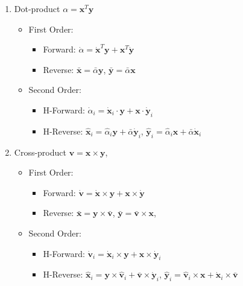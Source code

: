 \documentclass{article}
\newcommand{\vx}{\mathbf{x}}
\newcommand{\vxpi}{\dot{\mathbf{x}}_{i}}
\newcommand{\vxhi}{\hat{\mathbf{x}}_{i}}
\newcommand{\ab}{\bar{\alpha}}
\newcommand{\api}{\dot{\alpha}_{i}}
\newcommand{\ahi}{\hat{\alpha}_{i}}
\newcommand{\vy}{\mathbf{y}}
\newcommand{\vypi}{\dot{\mathbf{y}}_{i}}
\newcommand{\vyhi}{\hat{\mathbf{y}}_{i}}
\newcommand{\vvb}{\bar{\mathbf{v}}}
\newcommand{\vvpi}{\dot{\mathbf{v}}_{i}}
\newcommand{\vvhi}{\hat{\mathbf{v}}_{i}}
\begin{document}
\begin{enumerate}
        \item Dot-product $\alpha = \mathbf{x}^{T} \mathbf{y}$
        \begin{itemize}
            \item First Order:
            \begin{itemize}
                \item Forward: $\dot{\alpha} = \dot{\mathbf{x}}^{T} \mathbf{y} + \mathbf{x}^{T} \dot{\mathbf{y}}$
                \item Reverse: $\bar{\mathbf{x}} = \bar{\alpha} \mathbf{y}$, $\bar{\mathbf{y}} = \bar{\alpha} \mathbf{x}$
            \end{itemize}
            \item Second Order:
            \begin{itemize}
                \item H-Forward: $\api = \vxpi \cdot \vy + \vx \cdot \vypi$
                \item H-Reverse: $\vxhi = \ahi \vy + \ab \vypi$, $\vyhi = \ahi \vx + \ab \vxpi$
            \end{itemize}
        \end{itemize}

        \item Cross-product $\mathbf{v} = \mathbf{x} \times \mathbf{y}$,
        \begin{itemize}
            \item First Order:
            \begin{itemize}
                \item Forward: $\dot{\mathbf{v}} = \dot{\mathbf{x}} \times \mathbf{y} + \mathbf{x} \times \dot{\mathbf{y}}$
                \item Reverse: $\bar{\mathbf{x}} = \mathbf{y} \times \bar{\mathbf{v}}$, $\bar{\mathbf{y}} = \bar{\mathbf{v}} \times \mathbf{x}$,
            \end{itemize}
            \item Second Order:
            \begin{itemize}
                \item H-Forward: $\vvpi = \vxpi \times \vy + \vx \times \vypi$
                \item H-Reverse: $\vxhi = \vy \times \vvhi + \vvb \times \vypi$, $\vyhi = \vvhi \times \vx + \vxpi \times \vvb$
            \end{itemize}
        \end{itemize}


\end{enumerate}
\end{document}
